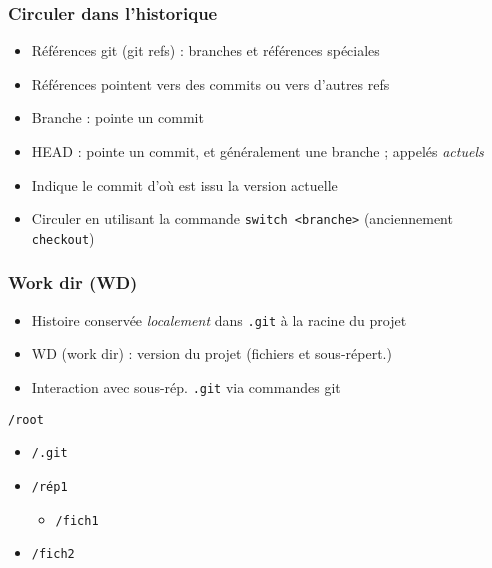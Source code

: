 \documentclass[english, french]{beamer}
\begin{document}
\begin{frame}
	\frametitle{Circuler dans l’historique}
	\begin{itemize}
		\item Références git (git refs) : branches et références spéciales
		\item Références pointent vers des commits ou vers d’autres refs
		\item Branche : pointe un commit
		\item HEAD : pointe un commit, et généralement une branche ; appelés \emph{actuels}
		\item Indique le commit d’où est issu la version actuelle
		\item Circuler en utilisant la commande \texttt{switch <branche>} {\tiny (anciennement \texttt{checkout})}
	\end{itemize}
	{
		\centering
		\par
	}
\end{frame}

\begin{frame}
	\frametitle{Work dir (WD)}
	\begin{itemize}
		\item Histoire conservée \emph{localement} dans \texttt{.git} à la racine du projet
		\item WD (\og{}work dir\fg{}) : version du projet (fichiers et sous-répert.)
		\item Interaction avec sous-rép. \texttt{.git} via commandes git
	\end{itemize}
	\texttt{/root}
	\begin{itemize}
		\item[] \texttt{/.git}
		\item[] \texttt{/rép1}
		\begin{itemize}
			\item[] \texttt{/fich1}
		\end{itemize}\vspace{-0.8ex}
		\item[] \texttt{/fich2}
	\end{itemize}
\end{frame}
\end{document}

